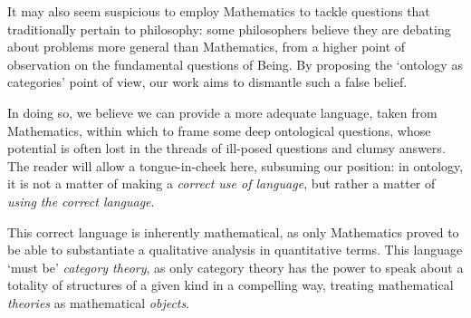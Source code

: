 It may also seem suspicious to employ Mathematics to tackle questions that traditionally pertain to philosophy: some philosophers believe they are debating about problems more general than Mathematics, from a higher point of observation on the fundamental questions of Being. By proposing the `ontology as categories' point of view, our work aims to dismantle such a false belief.%

In doing so, we believe we can provide a more adequate language, taken from Mathematics, within which to frame some deep ontological questions, whose potential is often lost in the threads of ill-posed questions and clumsy answers. The reader will allow a tongue-in-cheek here, subsuming our position: in ontology, it is not a matter of making a \emph{correct use of language}, but rather a matter of \emph{using the correct language}.

This correct language is inherently mathematical, as only Mathematics proved to be able to substantiate a qualitative analysis in quantitative terms. This language `must be' \emph{category theory}, as only category theory has the power to speak about a totality of structures of a given kind in a compelling way, treating mathematical \emph{theories} as mathematical \emph{objects}.

